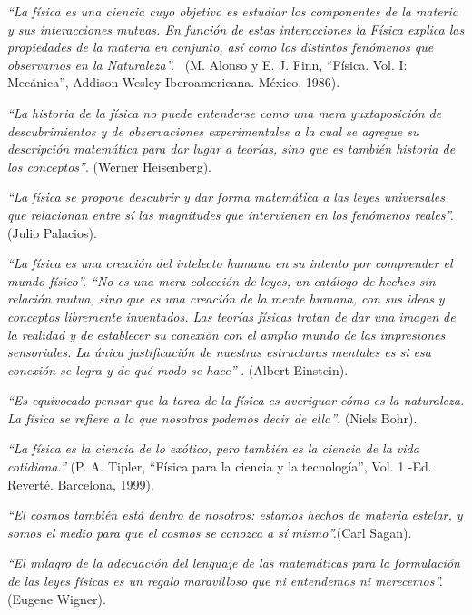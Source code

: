 \begin{changemargin}{1cm}{1cm}

\textit{``La física es una ciencia cuyo objetivo es estudiar los componentes de la materia y sus interacciones mutuas. En función de estas interacciones la Física explica las propiedades de la materia en conjunto, así como los distintos fenómenos que observamos en la Naturaleza''.}  \small{(M. Alonso y E. J. Finn, ``Física. Vol. I: Mecánica'', Addison-Wesley Iberoamericana. México, 1986)}\normalsize{.} 


\vspace{2mm} \textit{``La historia de la física no puede entenderse como una mera yuxtaposición de descubrimientos y de observaciones experimentales a la cual se agregue su descripción matemática para dar lugar a teorías, sino que es también historia de los conceptos''}. \small{(Werner Heisenberg)}\normalsize{.} 


\textit{``La física se propone descubrir y dar forma matemática a las leyes universales que relacionan entre sí las magnitudes que intervienen en los fenómenos reales''.} \small{(Julio Palacios)}\normalsize{.} 

\textit{``La física es una creación del intelecto humano en su intento por comprender el mundo físico''. ``No es una mera colección de leyes, un catálogo de hechos sin relación mutua, sino que es una creación de la mente humana, con sus ideas y conceptos libremente inventados. Las teorías físicas tratan de dar una imagen de la realidad y de establecer su conexión con el amplio mundo de las impresiones sensoriales. La única justificación de nuestras estructuras mentales es si esa conexión se logra y de qué modo se hace'' }. \small{(Albert Einstein)}\normalsize{.} 

\textit{``Es equivocado pensar que la tarea de la física es averiguar cómo es la naturaleza. La física se refiere a lo que nosotros podemos decir de ella''}. (\small{Niels Bohr)}\normalsize{.} 

\textit{``La física es la ciencia de lo exótico, pero también es la ciencia de la vida cotidiana.''}  \small{(P. A. Tipler, ``Física para la ciencia y la tecnología'', Vol. 1 -Ed. Reverté. Barcelona, 1999)}\normalsize{.} 

\textit{``El cosmos también está dentro de nosotros: estamos hechos de materia estelar, y somos el medio para que el cosmos se conozca a sí mismo''.}\small{(Carl Sagan)}\normalsize{.}

\textit{``El milagro de la adecuación del lenguaje de las matemáticas para la formulación de las leyes físicas es un regalo maravilloso que ni entendemos ni merecemos''.}\small{(Eugene Wigner)}\normalsize{.}


\end{changemargin}
